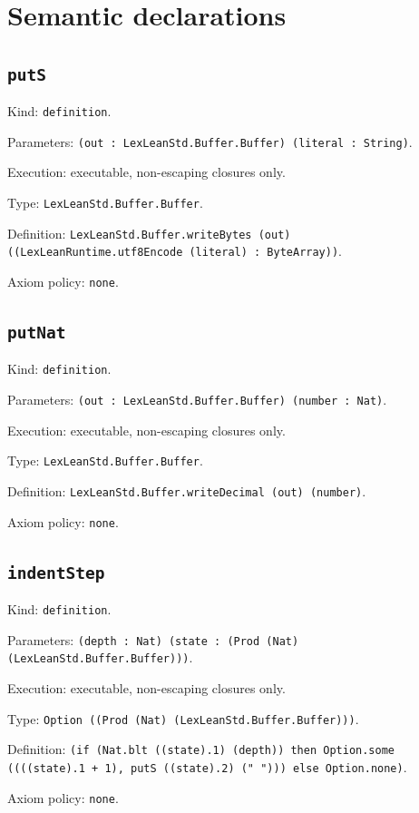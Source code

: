 \documentclass[11pt]{article}
\begin{document}
\section*{Semantic declarations}
\subsection*{\texttt{putS}}
\noindent Kind: \texttt{definition}.\par
\noindent Parameters: \texttt{(out : LexLeanStd.Buffer.Buffer) (literal : String)}.\par
\noindent Execution: executable, non-escaping closures only.\par
\noindent Type: \texttt{LexLeanStd.Buffer.Buffer}.\par
\noindent Definition: \texttt{LexLeanStd.Buffer.writeBytes (out) ((LexLeanRuntime.utf8Encode (literal) : ByteArray))}.\par
\noindent Axiom policy: \texttt{none}.\par
\subsection*{\texttt{putNat}}
\noindent Kind: \texttt{definition}.\par
\noindent Parameters: \texttt{(out : LexLeanStd.Buffer.Buffer) (number : Nat)}.\par
\noindent Execution: executable, non-escaping closures only.\par
\noindent Type: \texttt{LexLeanStd.Buffer.Buffer}.\par
\noindent Definition: \texttt{LexLeanStd.Buffer.writeDecimal (out) (number)}.\par
\noindent Axiom policy: \texttt{none}.\par
\subsection*{\texttt{indentStep}}
\noindent Kind: \texttt{definition}.\par
\noindent Parameters: \texttt{(depth : Nat) (state : (Prod (Nat) (LexLeanStd.Buffer.Buffer)))}.\par
\noindent Execution: executable, non-escaping closures only.\par
\noindent Type: \texttt{Option ((Prod (Nat) (LexLeanStd.Buffer.Buffer)))}.\par
\noindent Definition: \texttt{(if (Nat.blt ((state).1) (depth)) then Option.some ((((state).1 + 1), putS ((state).2) ("    "))) else Option.none)}.\par
\noindent Axiom policy: \texttt{none}.\par
\end{document}

